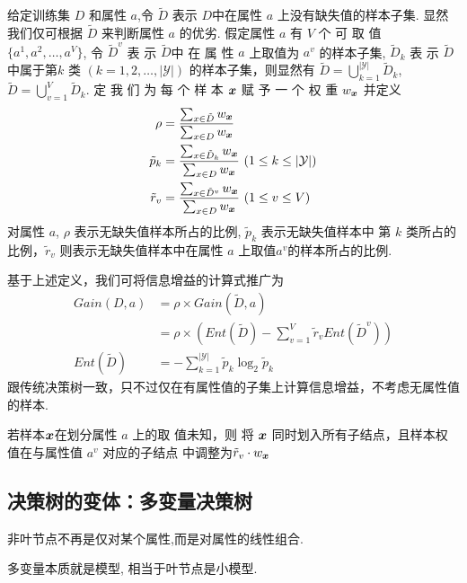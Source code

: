 给定训练集 $D$ 和属性 $a$,令 $\tilde{D}$ 表示 $D$中在属性 $a$ 上没有缺失值的样本子集. 显然我们仅可根据 $\tilde{D}$ 来判断属性 $a$ 的优劣. 假定属性 $a$ 有 $V$ 个 可 取 值 $\{ a^1,a^2,\dots,a^V \}$, 令 $\tilde{D}^v$ 表 示 $\tilde{D}$中 在 属 性 $a$ 上取值为 $a^v$ 的样本子集, $\tilde{D}_k$ 表 示 $\tilde{D}$ 中属于第$k$ 类 $(k = 1 , 2 ,\dots ,|\mathcal{Y}| )$ 的样本子集，则显然有 $\tilde{D}=\bigcup_{k=1}^{|\mathcal{Y}|}\tilde{D}_k$, $\tilde{D}=\bigcup_{v=1}^{V}\tilde{D}_k$. 定 我 们 为 每 个 样 本 $\bm{x}$ 赋 予 一 个 权 重 $w_{\bm{x}}$ 并定义
\begin{align*}
    \rho&=\frac{\sum_{x\in \tilde{D}}w_{\bm{x}}}{\sum_{x\in {D}}w_{\bm{x}}}\\
    \tilde{p}_k&=\frac{\sum_{x\in \tilde{D}_k}w_{\bm{x}}}{\sum_{x\in {D}}w_{\bm{x}}}\ (1\le k\le |\mathcal{Y}|)\\
    \tilde{r}_v&=\frac{\sum_{x\in \tilde{D}^v}w_{\bm{x}}}{\sum_{x\in {D}}w_{\bm{x}}}\ (1\le v\le V)
\end{align*}
对属性 $a$, $\rho$ 表示无缺失值样本所占的比例, $\tilde{p}_k$ 表示无缺失值样本中 第 $k$ 类所占的比例，$\tilde{r}_v$ 则表示无缺失值样本中在属性 $a$ 上取值$a^v$的样本所占的比例. 

基于上述定义，我们可将信息增益的计算式推广为
\begin{align*}
    Gain(D,a)&=\rho \times Gain(\tilde{D}, a)\\
    &=\rho\times \left( Ent(\tilde{D})-\sum_{v=1}^V\tilde{r}_v Ent(\tilde{D}^v) \right)\\
    Ent(\tilde{D})&=-\sum_{k=1}^{|\mathcal{Y}|}\tilde{p}_k\log_2 \tilde{p}_k
\end{align*}
跟传统决策树一致，只不过仅在有属性值的子集上计算信息增益，不考虑无属性值的样本. 

若样本$\bm{x}$在划分属性 $a$ 上的取 值未知，则 将 $\bm{x}$ 同时划入所有子结点，且样本权值在与属性值 $a^v$ 对应的子结点 中调整为$\tilde{r}_v\cdot w_{\bm{x}}$

\subsection{决策树的变体：多变量决策树}
非叶节点不再是仅对某个属性,而是对属性的线性组合. 

多变量本质就是模型, 相当于叶节点是小模型. 